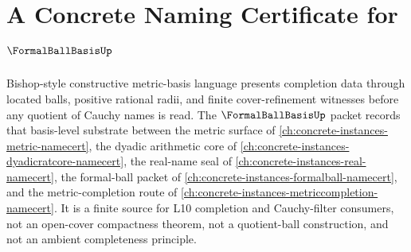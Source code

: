 \chapter{A Concrete Naming Certificate for $\FormalBallBasisUp$}
\label{ch:concrete-instances-formal-ball-basis-namecert}

Bishop-style constructive metric-basis language presents completion data through located balls, positive rational radii, and finite cover-refinement witnesses before any quotient of Cauchy names is read. The $\FormalBallBasisUp$ packet records that basis-level substrate between the metric surface of \autoref{ch:concrete-instances-metric-namecert}, the dyadic arithmetic core of \autoref{ch:concrete-instances-dyadicratcore-namecert}, the real-name seal of \autoref{ch:concrete-instances-real-namecert}, the formal-ball packet of \autoref{ch:concrete-instances-formalball-namecert}, and the metric-completion route of \autoref{ch:concrete-instances-metriccompletion-namecert}. It is a finite source for L10 completion and Cauchy-filter consumers, not an open-cover compactness theorem, not a quotient-ball construction, and not an ambient completeness principle.


